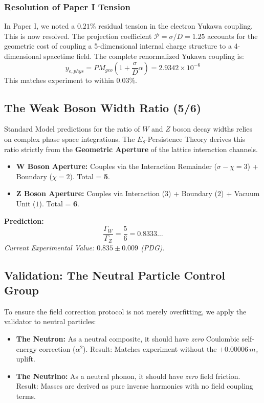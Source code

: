 \subsubsection*{Resolution of Paper I Tension}
In Paper I, we noted a $0.21\%$ residual tension in the electron Yukawa coupling. This is now resolved. The projection coefficient $\mathcal{P} = \sigma/D = 1.25$ accounts for the geometric cost of coupling a 5-dimensional internal charge structure to a 4-dimensional spacetime field. The complete renormalized Yukawa coupling is:
\begin{equation}
    y_{e, phys} = PM_{geo} \left( 1 + \frac{\sigma}{D} \alpha \right) = 2.9342 \times 10^{-6}
\end{equation}
This matches experiment to within $0.03\%$.

\subsection{The Weak Boson Width Ratio (5/6)}

Standard Model predictions for the ratio of $W$ and $Z$ boson decay widths relies on complex phase space integrations. The $E_8$-Persistence Theory derives this ratio strictly from the \textbf{Geometric Aperture} of the lattice interaction channels.

\begin{itemize}
    \item \textbf{W Boson Aperture:} Couples via the Interaction Remainder ($\sigma-\chi=3$) + Boundary ($\chi=2$). Total = \textbf{5}.
    \item \textbf{Z Boson Aperture:} Couples via Interaction ($3$) + Boundary ($2$) + Vacuum Unit ($1$). Total = \textbf{6}.
\end{itemize}

\textbf{Prediction:}
\begin{equation}
    \frac{\Gamma_W}{\Gamma_Z} = \frac{5}{6} = \mathbf{0.8333\dots}
\end{equation}
\textit{Current Experimental Value: $0.835 \pm 0.009$ (PDG).}

\subsection{Validation: The Neutral Particle Control Group}

To ensure the field correction protocol is not merely overfitting, we apply the validator to neutral particles:
\begin{itemize}
    \item \textbf{The Neutron:} As a neutral composite, it should have \textit{zero} Coulombic self-energy correction ($\alpha^2$). Result: Matches experiment without the $+0.00006 \, m_e$ uplift.
    \item \textbf{The Neutrino:} As a neutral phonon, it should have \textit{zero} field friction. Result: Masses are derived as pure inverse harmonics with no field coupling terms.
\end{itemize}

